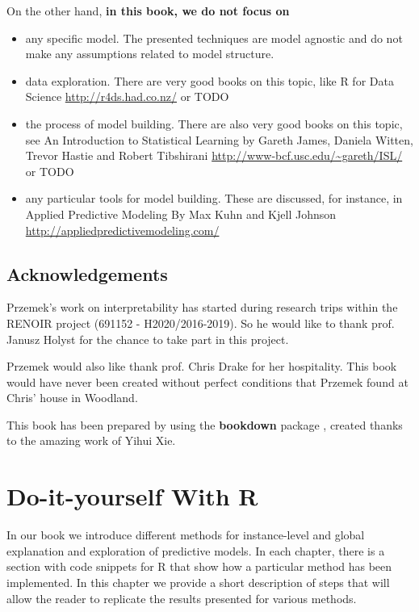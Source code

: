 \documentclass[12pt,]{krantz}
\providecommand{\tightlist}{%
  \setlength{\itemsep}{0pt}\setlength{\parskip}{0pt}}
\theoremstyle{definition}
\theoremstyle{definition}
\theoremstyle{definition}
\theoremstyle{remark}
\begin{document}
On the other hand, \textbf{in this book, we do not focus on}

\begin{itemize}
\tightlist
\item
  any specific model. The presented techniques are model agnostic and do
  not make any assumptions related to model structure.
\item
  data exploration. There are very good books on this topic, like R for
  Data Science \url{http://r4ds.had.co.nz/} or TODO
\item
  the process of model building. There are also very good books on this
  topic, see An Introduction to Statistical Learning by Gareth James,
  Daniela Witten, Trevor Hastie and Robert Tibshirani
  \url{http://www-bcf.usc.edu/~gareth/ISL/} or TODO
\item
  any particular tools for model building. These are discussed, for
  instance, in Applied Predictive Modeling By Max Kuhn and Kjell Johnson
  \url{http://appliedpredictivemodeling.com/}
\end{itemize}

\hypertarget{thanksto}{%
\subsection{Acknowledgements}\label{thanksto}}

Przemek's work on interpretability has started during research trips
within the RENOIR project (691152 - H2020/2016-2019). So he would like
to thank prof. Janusz Holyst for the chance to take part in this
project.

Przemek would also like thank prof. Chris Drake for her hospitality.
This book would have never been created without perfect conditions that
Przemek found at Chris' house in Woodland.

This book has been prepared by using the \textbf{bookdown} package
\citep{R-bookdown}, created thanks to the amazing work of Yihui Xie.

\hypertarget{doItYourselfWithR}{%
\section{Do-it-yourself With R}\label{doItYourselfWithR}}

In our book we introduce different methods for instance-level and global
explanation and exploration of predictive models. In each chapter, there
is a section with code snippets for R that show how a particular method
has been implemented. In this chapter we provide a short description of
steps that will allow the reader to replicate the results presented for
various methods.
\end{document}
